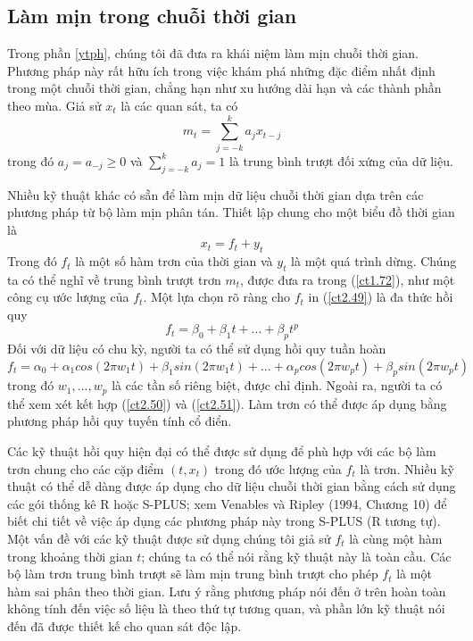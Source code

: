 \documentclass[12pt, a4paper,oneside]{book}
\theoremstyle{definition}
\begin{document}
\subsection{Làm mịn trong chuỗi thời gian}
Trong phần \ref{ytph}, chúng tôi đã đưa ra khái niệm làm mịn chuỗi thời gian. Phương pháp này rất hữu ích trong việc khám phá những đặc điểm nhất định trong một chuỗi thời gian, chẳng hạn như xu hướng dài hạn và các thành phần theo mùa. Giả sử $ x_{t} $ là các quan sát, ta có
\begin{equation}
m_{t}= \sum_{j=-k}^{k} a_{j}x_{t-j} \label{ct1.72}	
\end{equation}
trong đó $a_{j}=a_{-j}\geq 0$ và $\sum_{j=-k}^{k} a_{j}=1$ là trung bình trượt đối xứng của dữ liệu.

Nhiều kỹ thuật khác có sẵn để làm mịn dữ liệu chuỗi thời gian dựa trên các phương pháp từ bộ làm mịn phân tán. Thiết lập chung cho một biểu đồ thời gian là
\begin{equation}
x_t=f_t+y_t  \label{ct2.49}
\end{equation}
Trong đó $ f_t $ là một số hàm trơn của thời gian và $ y_t $ là một quá trình dừng. Chúng ta có thể nghĩ về trung bình trượt trơn $ m_t $, được đưa ra trong (\ref{ct1.72}), như một công cụ ước lượng của $ f_t $. Một lựa chọn rõ ràng cho $ f_t $ in (\ref{ct2.49}) là đa thức hồi quy 
\begin{equation}
f_t= \beta_0+\beta_1 t+...+\beta_p t^p \label{ct2.50}
\end{equation}
Đối với dữ liệu có chu kỳ, người ta có thể sử dụng hồi quy tuần hoàn
\begin{equation}
f_t = \alpha_0+\alpha_1 cos(2\pi w_1 t)+\beta_1 sin(2\pi w_1 t)
+...+\alpha_p cos(2\pi w_p t)+\beta_p sin(2\pi w_p t)  \label{ct2.51}
\end{equation}
trong đó $ w_1,...,w_p $ là các tần số riêng biệt, được chỉ định. Ngoài ra, người ta có thể xem xét kết hợp (\ref{ct2.50}) và (\ref{ct2.51}). Làm trơn có thể được áp dụng bằng phương pháp hồi quy tuyến tính cổ điển.

Các kỹ thuật hồi quy hiện đại có thể được sử dụng để phù hợp với các bộ làm trơn chung cho các cặp điểm $ (t,x_t) $ trong đó ước lượng của $ f_t $ là trơn. Nhiều kỹ thuật có thể dễ dàng được áp dụng cho dữ liệu chuỗi thời gian bằng cách sử dụng các gói thống kê R hoặc S-PLUS; xem Venables và Ripley (1994, Chương 10) để biết chi tiết về việc áp dụng các phương pháp này trong S-PLUS (R tương tự). Một vấn đề với các kỹ thuật được sử dụng chúng tôi giả sử $ f_t $ là cùng một hàm trong khoảng thời gian $ t $; chúng ta có thể nói rằng kỹ thuật này là toàn cầu. Các bộ làm trơn trung bình trượt sẽ làm mịn trung bình trượt cho phép $ f_t $ là một hàm sai phân theo thời gian. Lưu ý rằng phương pháp nói đến ở trên hoàn toàn không tính đến việc số liệu là theo thứ tự tương quan, và phần lớn kỹ thuật nói đến đã được thiết kế cho quan sát độc lập.
\end{document}
